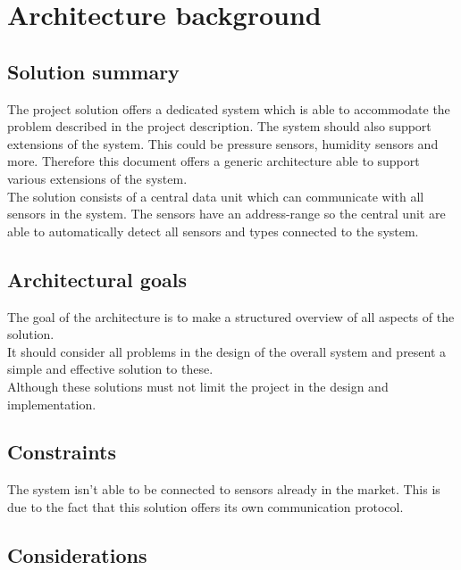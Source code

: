 \chapter{Architecture background}

\section{Solution summary}
The project solution offers a dedicated system which is able to accommodate the problem described in the project description. The system should also support extensions of the system. This could be pressure sensors, humidity sensors and more. Therefore this document offers a generic architecture able to support various extensions of the system.\\
The solution consists of a central data unit which can communicate with all sensors in the system. The sensors have an address-range so the central unit are able to automatically detect all sensors and types connected to the system. 

\section{Architectural goals}
The goal of the architecture is to make a structured overview of all aspects of the solution.\\
It should consider all problems in the design of the overall system and present a simple and effective solution to these.\\
Although these solutions must not limit the project in the design and implementation.\\

\section{Constraints}
The system isn't able to be connected to sensors already in the market. This is due to the fact that this solution offers its own communication protocol.\\

\section{Considerations}

